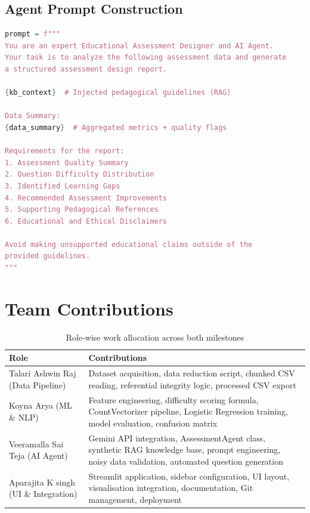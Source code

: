 \documentclass[12pt, a4paper]{article}
\begin{document}
\subsection{Agent Prompt Construction}
\begin{lstlisting}[language=Python, caption={Prompt template for assessment report generation}]
prompt = f"""
You are an expert Educational Assessment Designer and AI Agent.
Your task is to analyze the following assessment data and generate 
a structured assessment design report.

{kb_context}  # Injected pedagogical guidelines (RAG)

Data Summary:
{data_summary}  # Aggregated metrics + quality flags

Requirements for the report:
1. Assessment Quality Summary
2. Question Difficulty Distribution
3. Identified Learning Gaps
4. Recommended Assessment Improvements
5. Supporting Pedagogical References
6. Educational and Ethical Disclaimers

Avoid making unsupported educational claims outside of the 
provided guidelines.
"""
\end{lstlisting}

\section{Team Contributions}
\label{app:contributions}

\begin{table}[H]
\centering
\caption{Role-wise work allocation across both milestones}
\begin{tabularx}{\textwidth}{lX}
\toprule
\textbf{Role} & \textbf{Contributions} \\
\midrule
Talari Ashwin Raj (Data Pipeline) & Dataset acquisition, data reduction script, chunked CSV reading, referential integrity logic, processed CSV export \\
Koyna Arya (ML \& NLP) & Feature engineering, difficulty scoring formula, CountVectorizer pipeline, Logistic Regression training, model evaluation, confusion matrix \\
Veeramalla Sai Teja (AI Agent) & Gemini API integration, AssessmentAgent class, synthetic RAG knowledge base, prompt engineering, noisy data validation, automated question generation \\
Aparajita K singh (UI \& Integration) & Streamlit application, sidebar configuration, UI layout, visualisation integration, documentation, Git management, deployment \\
\bottomrule
\end{tabularx}
\end{table}
\end{document}
